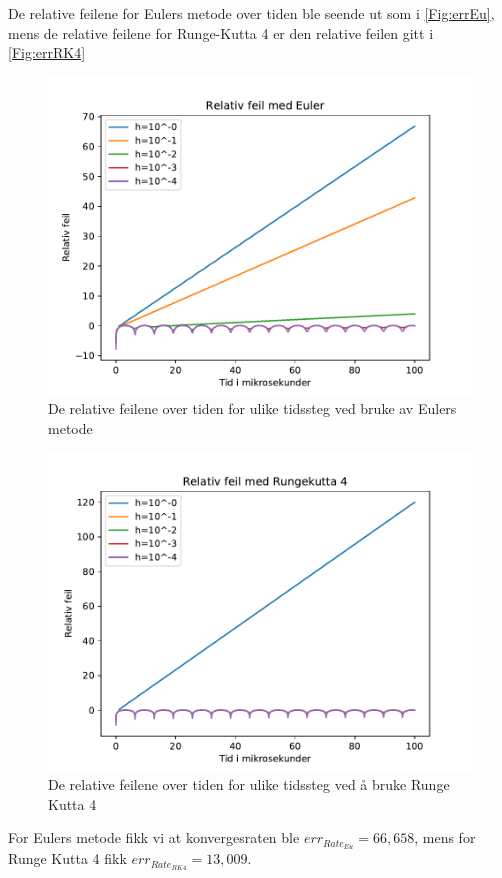 \documentclass[reprint,english,notitlepage, nofootinbib]{revtex4-1}  %
\begin{document}
De relative feilene for Eulers metode over tiden ble seende ut som i \autoref{Fig:errEu}, mens de relative feilene for Runge-Kutta 4 er den relative feilen gitt i \autoref{Fig:errRK4}
\begin{figure}[H]
	\centering 
	\includegraphics[scale=0.4]{../pythonplots/RelerrEu.pdf}
	\caption{De relative feilene over tiden for ulike tidssteg ved bruke av Eulers metode}
	\label{Fig:errEu}
\end{figure}
\begin{figure}[H]
	\centering 
	\includegraphics[scale=0.4]{../pythonplots/RelerrRK4.pdf}
	\caption{De relative feilene over tiden for ulike tidssteg ved å bruke Runge Kutta 4}
	\label{Fig:errRK4}
\end{figure}
For Eulers metode fikk vi at konvergesraten ble $err_{Rate_{Eu}}=66,658$, mens for Runge Kutta 4 fikk $err_{Rate_{RK4}}=13,009$.
\end{document}
